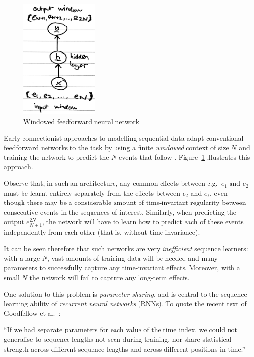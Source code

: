 \documentclass[12pt,a4paper,twoside,openright]{report}
\begin{document}
\begin{figure}[H]
\centering
\includegraphics[width=110pt]{figs/windowed_nn_tmp.jpg}
\caption{Windowed feedforward neural network}
\label{fig:windowed-nn}
\end{figure}

Early connectionist approaches to modelling sequential data adapt conventional
feedforward networks to the task by using a finite \emph{windowed} context of
size $N$ and training the network to predict the $N$ events that follow
\cite{todd1989connectionist}. Figure~\ref{fig:windowed-nn} illustrates this
approach.

Observe that, in such an architecture, any common effects between e.g.\ $e_1$
and $e_2$ must be learnt entirely separately from the effects between $e_2$ and
$e_3$, even though there may be a considerable amount of time-invariant
regularity between consecutive events in the sequences of interest. Similarly,
when predicting the output $e_{N+1}^{2N}$, the network will have to learn how to
predict each of these events independently from each other (that is, without
time invariance).  

It can be seen therefore that such networks are very \emph{inefficient} sequence
learners: with a large $N$, vast amounts of training data will be needed and
many parameters to successfully capture any time-invariant effects. Moreover,
with a small $N$ the network will fail to capture any long-term effects.

One solution to this problem is \emph{parameter sharing}, and is central to the
sequence-learning ability of \emph{recurrent neural networks} (RNNs). To quote
the recent text of Goodfellow et al.\ \cite{Goodfellow-et-al-2016}:
\begin{displayquote}
  ``If we had separate parameters for each value of the time index, we could not
  generalise to sequence lengths not seen during training, nor share statistical
  strength across different sequence lengths and across diﬀerent positions in
  time.''
\end{displayquote}
\end{document}
